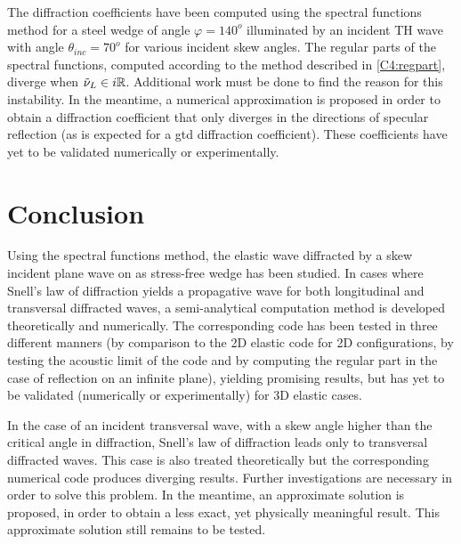 The diffraction coefficients have been computed using the spectral functions method for a steel wedge of angle $\varphi=140^o$ illuminated by an incident TH wave with angle $\theta_{inc}=70^o$ for various incident skew angles. The regular parts of the spectral functions, computed according to the method described in \ref{C4:regpart}, diverge when $\tilde{\nu}_L \in i\mathbb{R}$. Additional work must be done to find the reason for this instability. In the meantime, a numerical approximation is proposed in order to obtain a diffraction coefficient that only diverges in the directions of specular reflection (as is expected for a \acrshort{gtd} diffraction coefficient). These coefficients have yet to be validated numerically or experimentally.

\section*{Conclusion}
Using the spectral functions method, the elastic wave diffracted by a skew incident plane wave on as stress-free wedge has been studied. In cases where Snell's law of diffraction yields a propagative wave for both longitudinal and transversal diffracted waves, a semi-analytical computation method is developed theoretically and numerically. The corresponding code has been tested in three different manners (by comparison to the 2D elastic code for 2D configurations, by testing the acoustic limit of the code and by computing the regular part in the case of reflection on an infinite plane), yielding promising results, but has yet to be validated (numerically or experimentally) for 3D elastic cases. 

In the case of an incident transversal wave, with a skew angle higher than the critical angle in diffraction, Snell's law of diffraction leads only to transversal diffracted waves. This case is also treated theoretically but the corresponding numerical code produces diverging results. Further investigations are necessary in order to solve this problem. In the meantime, an approximate solution is proposed, in order to obtain a less exact, yet physically meaningful result. This approximate solution still remains to be tested.
